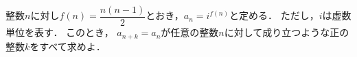 \documentclass[../../main.tex]{subfiles}
\begin{document}
整数$n$に対し$\displaystyle f(n)=\dfrac{n(n-1)}{2}$とおき，$a_n=i^{f(n)}$と定める．
ただし，$i$は虚数単位を表す．
このとき，
$a_{n+k}=a_n$が任意の整数$n$に対して成り立つような正の整数$k$をすべて求めよ．
\end{document}
